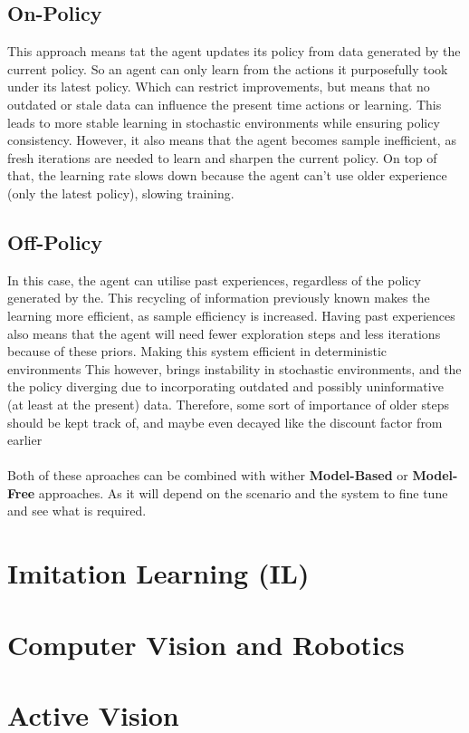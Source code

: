   \subsection{On-Policy}
  This approach means tat the agent updates its policy from data generated by the current policy. So an agent can only learn from the actions it purposefully took under its latest policy. Which can restrict improvements, but means that no outdated or stale data can influence the present time actions or learning.
  This leads to more stable learning in stochastic environments  while ensuring policy consistency.
  However, it also means that the agent becomes sample inefficient, as fresh iterations are needed to learn and sharpen the current policy. On top of that, the learning rate slows down because the agent can't use older experience (only the latest policy), slowing training.


  \subsection{Off-Policy}
  In this case, the agent can utilise past experiences, regardless of the policy generated by the. This recycling of information previously known makes the learning more efficient, as sample efficiency is increased.
  Having past experiences also means that the agent will need fewer exploration steps and less iterations because of these priors. Making this system efficient in deterministic environments 
  This however, brings instability in stochastic environments, and the the policy diverging due to incorporating outdated and possibly uninformative (at least at the present) data. Therefore, some sort of importance of older steps should be kept track of, and maybe even decayed like the discount factor from earlier 
  \\\\
  Both of these aproaches can be combined with wither \textbf{Model-Based} or \textbf{Model-Free} approaches. As it will depend on the scenario and the system to fine tune and see what is required.


\section{Imitation Learning (IL)}
\section{Computer Vision and Robotics}
\section{Active Vision}